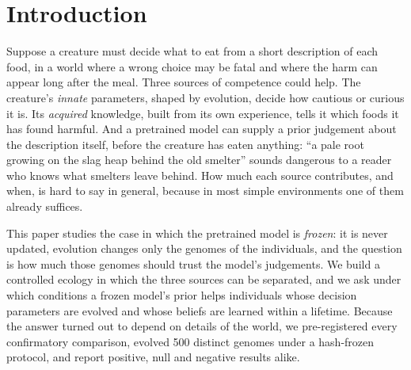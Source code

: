 \section{Introduction}
\label{sec:intro}

Suppose a creature must decide what to eat from a short description of each food, in a world where a wrong choice may be fatal and where the harm can appear long after the meal. Three sources of competence could help. The creature's \emph{innate} parameters, shaped by evolution, decide how cautious or curious it is. Its \emph{acquired} knowledge, built from its own experience, tells it which foods it has found harmful. And a pretrained model can supply a prior judgement about the description itself, before the creature has eaten anything: ``a pale root growing on the slag heap behind the old smelter'' sounds dangerous to a reader who knows what smelters leave behind. How much each source contributes, and when, is hard to say in general, because in most simple environments one of them already suffices.

This paper studies the case in which the pretrained model is \emph{frozen}: it is never updated, evolution changes only the genomes of the individuals, and the question is how much those genomes should trust the model's judgements. We build a controlled ecology in which the three sources can be separated, and we ask under which conditions a frozen model's prior helps individuals whose decision parameters are evolved and whose beliefs are learned within a lifetime. Because the answer turned out to depend on details of the world, we pre-registered every confirmatory comparison, evolved 500 distinct genomes under a hash-frozen protocol, and report positive, null and negative results alike.

